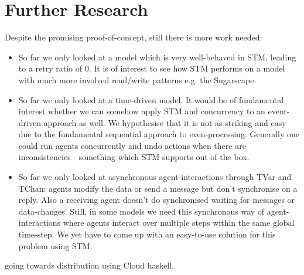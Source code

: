 \section{Further Research}
Despite the promising proof-of-concept, still there is more work needed:

\begin{itemize}
	\item So far we only looked at a model which is very well-behaved in STM, leading to a retry ratio of 0. It is of interest to see how STM performs on a model with much more involved read/write patterns e.g. the Sugarscape.
	\item So far we only looked at a time-driven model. It would be of fundamental interest whether we can somehow apply STM and concurrency to an event-driven approach as well. We hypothesise that it is not as striking and easy due to the fundamental sequential approach to even-processing. Generally one could run agents concurrently and undo actions when there are inconsistencies - something which STM supports out of the box.
	\item So far we only looked at asynchronous agent-interactions through TVar and TChan: agents modify the data or send a message but don't synchronise on a reply. Also a receiving agent doesn't do synchronised waiting for messages or data-changes. Still, in some models we need this synchronous way of agent-interactions where agents interact over multiple steps within the same global time-step. We yet have to come up with an easy-to-use solution for this problem using STM.
\end{itemize}

going towards distribution using Cloud haskell.